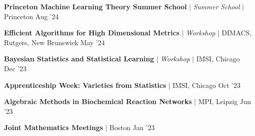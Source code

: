 
\resumeProjectHeading
{\textbf{Princeton Machine Learning Theory Summer School} $|$ \textit{Summer School} $|$ Princeton}
{Aug '24}
{}
\vspace{\mygap}

\resumeProjectHeading
{\textbf{Efficient Algorithms for High Dimensional Metrics} $|$ \textit{Workshop} $|$ DIMACS, Rutgers, New Brunswick}
{May '24}
{}
\vspace{\mygap}

\resumeProjectHeading
{\textbf{Bayesian Statistics and Statistical Learning} $|$ \textit{Workshop} $|$ IMSI, Chicago}
{Dec '23}
{}
\vspace{\mygap}


\resumeProjectHeading
{\textbf{Apprenticeship Week: Varieties from Statistics} $|$ IMSI, Chicago}
{{Oct '23}}
{}
\vspace{\mygap}


\resumeProjectHeading
{\textbf{Algebraic Methods in Biochemical Reaction Networks}  $|$ MPI, Leipzig}
{{Jun '23}}
{}
\vspace{\mygap}


\resumeProjectHeading
{\textbf{Joint Mathematics Meetings}   $|$ Boston }
{Jan '23}
{}
\vspace{\mygap}



